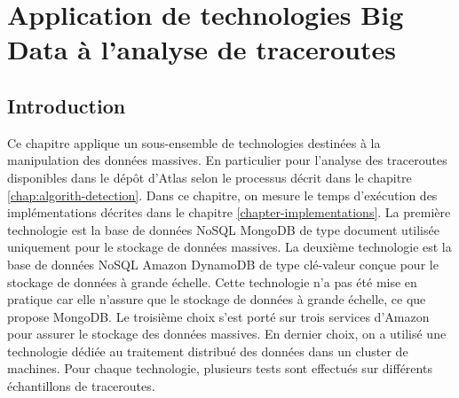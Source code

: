\chapter{Application de  technologies Big Data à l'analyse de  traceroutes} \label{chap:application-on-traceroutes}


\section{Introduction}

Ce chapitre applique un sous-ensemble de  technologies destinées  à la manipulation des données massives. En particulier  pour l'analyse des traceroutes disponibles dans le dépôt d'Atlas selon le processus décrit dans le chapitre \ref{chap:algorith-detection}. Dans ce chapitre, on mesure le temps d'exécution  des  implémentations  décrites dans le chapitre \ref{chapter-implementations}.  
 La première technologie est la base de données NoSQL MongoDB de type document  utilisée uniquement pour le stockage de données massives. La deuxième technologie est la base de données NoSQL  Amazon DynamoDB de type clé-valeur conçue pour le stockage de données à grande échelle. Cette technologie n'a pas été  mise en pratique car elle n'assure que le stockage de données à grande échelle, ce que propose MongoDB.
 Le troisième choix s'est porté sur trois services d'Amazon pour assurer le stockage des données massives. En dernier choix, on a  utilisé une technologie dédiée  au traitement distribué des données dans un cluster de machines. Pour chaque technologie, plusieurs tests sont effectués sur différents échantillons de traceroutes.


 
